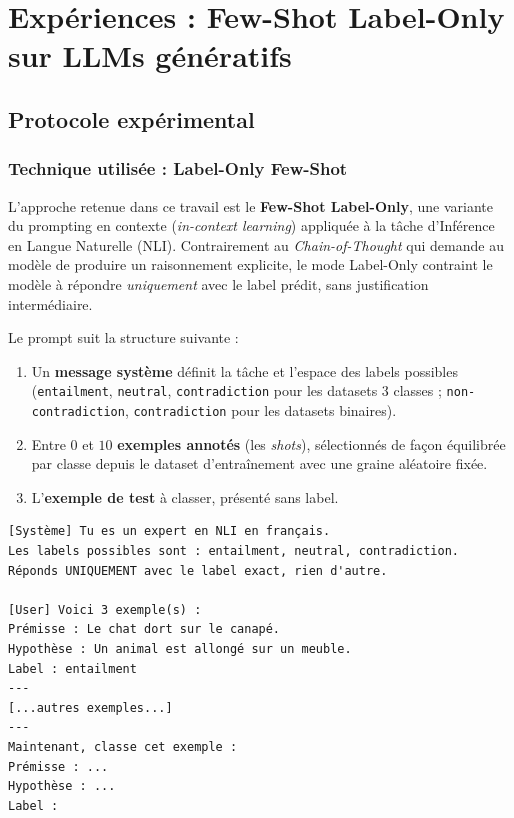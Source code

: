 \section{Expériences : Few-Shot Label-Only sur LLMs génératifs}

\subsection{Protocole expérimental}

\subsubsection{Technique utilisée : Label-Only Few-Shot}

L'approche retenue dans ce travail est le \textbf{Few-Shot Label-Only}, une variante du prompting en contexte (\textit{in-context learning}) appliquée à la tâche d'Inférence en Langue Naturelle (NLI). Contrairement au \textit{Chain-of-Thought} qui demande au modèle de produire un raisonnement explicite, le mode Label-Only contraint le modèle à répondre \emph{uniquement} avec le label prédit, sans justification intermédiaire.

Le prompt suit la structure suivante :

\begin{enumerate}
    \item Un \textbf{message système} définit la tâche et l'espace des labels possibles (\texttt{entailment}, \texttt{neutral}, \texttt{contradiction} pour les datasets 3 classes ; \texttt{non-contradiction}, \texttt{contradiction} pour les datasets binaires).
    \item Entre $0$ et $10$ \textbf{exemples annotés} (les \textit{shots}), sélectionnés de façon équilibrée par classe depuis le dataset d'entraînement avec une graine aléatoire fixée.
    \item L'\textbf{exemple de test} à classer, présenté sans label.
\end{enumerate}

\begin{verbatim}
[Système] Tu es un expert en NLI en français. 
Les labels possibles sont : entailment, neutral, contradiction.
Réponds UNIQUEMENT avec le label exact, rien d'autre.

[User] Voici 3 exemple(s) :
Prémisse : Le chat dort sur le canapé.
Hypothèse : Un animal est allongé sur un meuble.
Label : entailment
---
[...autres exemples...]
---
Maintenant, classe cet exemple :
Prémisse : ...
Hypothèse : ...
Label :
\end{verbatim}


